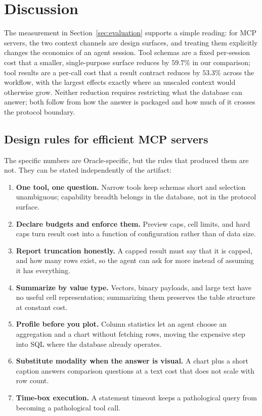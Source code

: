 \section{Discussion}\label{sec:discussion}

The measurement in Section~\ref{sec:evaluation} supports a simple reading: for MCP servers, the two context channels are design surfaces, and treating them explicitly changes the economics of an agent session. Tool schemas are a fixed per-session cost that a smaller, single-purpose surface reduces by $59.7$\% in our comparison; tool results are a per-call cost that a result contract reduces by $53.3$\% across the workflow, with the largest effects exactly where an unscaled context would otherwise grow. Neither reduction requires restricting what the database can answer; both follow from how the answer is packaged and how much of it crosses the protocol boundary.

\subsection{Design rules for efficient MCP servers}

The specific numbers are Oracle-specific, but the rules that produced them are not. They can be stated independently of the artifact:

\begin{enumerate}
  \item \textbf{One tool, one question.} Narrow tools keep schemas short and selection unambiguous; capability breadth belongs in the database, not in the protocol surface.
  \item \textbf{Declare budgets and enforce them.} Preview caps, cell limits, and hard caps turn result cost into a function of configuration rather than of data size.
  \item \textbf{Report truncation honestly.} A capped result must say that it is capped, and how many rows exist, so the agent can ask for more instead of assuming it has everything.
  \item \textbf{Summarize by value type.} Vectors, binary payloads, and large text have no useful cell representation; summarizing them preserves the table structure at constant cost.
  \item \textbf{Profile before you plot.} Column statistics let an agent choose an aggregation and a chart without fetching rows, moving the expensive step into SQL where the database already operates.
  \item \textbf{Substitute modality when the answer is visual.} A chart plus a short caption answers comparison questions at a text cost that does not scale with row count.
  \item \textbf{Time-box execution.} A statement timeout keeps a pathological query from becoming a pathological tool call.
\end{enumerate}

